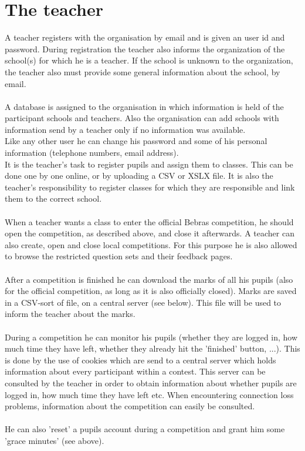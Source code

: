 \section{The teacher}

A teacher registers with the organisation by email and is given an user id and password. During
registration the teacher also informs the organization of the school(s) for which he is a teacher. If the school is unknown to the organization, the teacher also must provide some general information about the school, by email. \\
\\
A database is assigned to the organisation in which information is held of the participant schools and teachers. Also the organisation can add schools with information send by a teacher only if no information was available. \\
Like any other user he can change his password and some of his personal information (telephone numbers, email address).\\
It is the teacher's task to register pupils and assign them to classes. This can be done one by one online, or by uploading a CSV or XSLX file. It is also the teacher's responsibility to register classes for which they are responsible and link them to the correct school.\\
\\
When a teacher wants a class to enter the official Bebras competition, he should open the competition, as described above, and close it afterwards. A teacher can also create, open and close local competitions. For this purpose he is also allowed to browse the restricted question sets and their feedback pages.\\
\\
After a competition is finished he can download the marks of all his pupils (also for the official competition, as long as it is also officially closed). Marks are saved in a CSV-sort of file, on a central server (see below). This file will be used to inform the teacher about the marks.\\
\\
During a competition he can monitor his pupils (whether they are logged in, how much time they have left, whether they already hit the 'finished' button, ...). This is done by the use of cookies which are send to a central server which holds information about every participant within a contest. This server can be consulted by the teacher in order to obtain information about whether pupils are logged in, how much time they have left etc. When encountering connection loss problems, information about the competition can easily be consulted.  \\
\\
He can also 'reset' a pupils account during a competition and grant him some 'grace minutes' (see above).